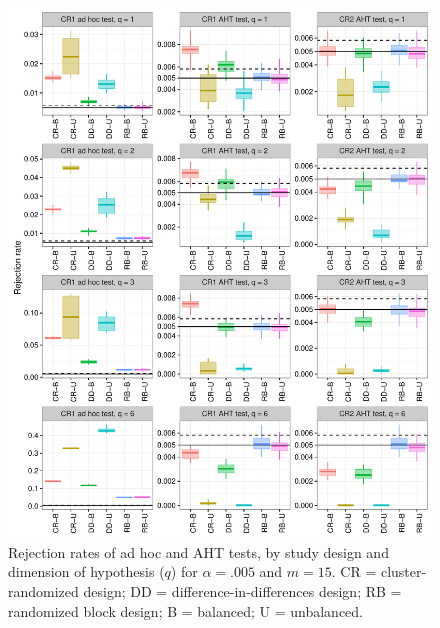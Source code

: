 \documentclass{article}\usepackage[]{graphicx}\usepackage[]{color}
\newenvironment{knitrout}{}{} %
\begin{document}
\begin{knitrout}
\color{fgcolor}\begin{figure}[H]

{\centering \includegraphics[width=\linewidth]{CR_fig/balance_005_15-1} 

}

\caption[Rejection rates of ad hoc and AHT tests, by study design and dimension of hypothesis (]{Rejection rates of ad hoc and AHT tests, by study design and dimension of hypothesis ($q$) for $\alpha = .005$ and $m = 15$. CR = cluster-randomized design; DD = difference-in-differences design; RB = randomized block design; B = balanced; U = unbalanced.}\label{fig:balance_005_15}
\end{figure}


\end{knitrout}
\end{document}
